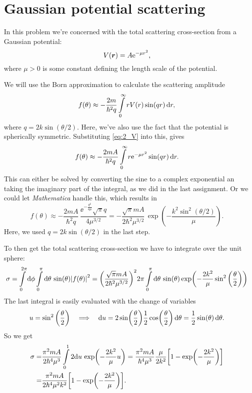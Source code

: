 \documentclass[11pt,letter, swedish, english
]{article}
\begin{document}
\section{Gaussian potential scattering}
In this problem we're concerned with the total scattering
cross-section from a Gaussian potential:
\begin{equation}\label{eq:2_V}
V(\vb*{r})=A\mathrm{e}^{-\mu r^2},
\end{equation}
where $\mu>0$ is some constant defining the length scale of the potential.

We will use the Born approximation to calculate the scattering
amplitude
\begin{equation}
f(\theta)\approx -\frac{2m}{\hbar^2q}
\int_0^\infty r V(r) \sin(qr)\id{r},
\end{equation}
where $q=2k\sin(\theta/2)$. Here, we've also use the fact that the
potential is spherically symmetric.
Substituting \eqref{eq:2_V} into this, gives
\begin{equation}
f(\theta)\approx -\frac{2mA}{\hbar^2q}
\int_0^\infty r \ee^{-\mu r^2} \sin(qr)\id{r}.
\end{equation}
This can either be solved by converting the sine to a complex
exponential an taking the imaginary part of the integral, as we did in
the last assignment. Or we could let \textit{Mathematica} handle this,
which results in
\begin{equation}
f(\theta)\approx -\frac{2mA}{\hbar^2q}\,
\frac{\ee^{-\frac{q^2}{4\mu}}\sqrt{\pi}q}{4\mu^{3/2}}
=-\frac{\sqrt{\pi}mA}{2\hbar^2\mu^{3/2}}\,\exp(-\frac{k^2\sin^2(\theta/2)}{\mu}).
\end{equation}
Here, we used $q=2k\sin(\theta/2)$ in the last step.

To then get the total scattering cross-section we have to integrate
over the unit sphere:
\begin{equation}
\sigma=\int_0^{2\pi}\rd{\phi}
\int_0^\pi\rd\theta\,\sin(\theta) \abs{f(\theta)}^2
=\qty(\frac{\sqrt{\pi}mA}{2\hbar^2\mu^{3/2}})^2 2\pi 
\int_0^\pi\rd\theta\,\sin(\theta)
\exp(-\frac{2k^2}{\mu}\sin^2\qty(\frac{\theta}{2}))
\end{equation}
The last integral is easily evaluated with the change of variables
\begin{equation}
u=\sin^2\qty(\frac{\theta}{2})
\quad\Longrightarrow\quad
\mathrm{d}{u}=
2\sin(\frac{\theta}{2})\frac{1}{2}\cos(\frac{\theta}{2})\,\mathrm{d}\theta
=\frac{1}{2}\sin(\theta)\,\mathrm{d}\theta.
\end{equation}
So we get
\begin{equation}\label{eq:2_final}
\begin{aligned}
\sigma=&
\frac{\pi^2mA}{2\hbar^4\mu^{3}}  
\int_0^1 2\rd{u}\,\exp(-\frac{2k^2}{\mu}u)
=\frac{\pi^2mA}{\hbar^4\mu^{3}} \frac{\mu}{2k^2}
\qty[1-\exp(-\frac{2k^2}{\mu})]\\
=&\frac{\pi^2mA}{2\hbar^4\mu^{2}k^2}
\qty[1-\exp(-\frac{2k^2}{\mu})].
\end{aligned}
\end{equation}
\end{document}

